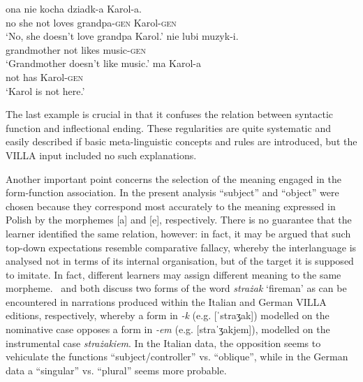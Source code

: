 \ea%
    \label{ex:08:6}
    \ea\label{ex:08:6a}
       {ona}   {nie}   {kocha}   {dziadk-a}   {Karol-a.} \\
            no  she  not  loves  grandpa-\textsc{gen}  Karol-\textsc{gen} \\
    \glt    ‘No, she doesn't love grandpa Karol.’
    \ex\label{ex:08:6b}
       {nie}   {lubi}   {muzyk-i.}\\
            grandmother  not  likes  music-\textsc{gen}\\
    \glt    ‘Grandmother doesn't like music.’
    \ex\label{ex:08:6c}
      {ma}  {Karol-a}\\
            not  has  Karol-\textsc{gen}\\
    \glt    ‘Karol is not here.’
    \z
\z

The last example is crucial in that it confuses the relation between syntactic function and inflectional ending. These regularities are quite systematic and easily described if basic meta-linguistic concepts and rules are introduced, but the VILLA input included no such explanations. 

Another important point concerns the selection of the meaning engaged in the form-function association. In the present analysis “subject” and “object” were chosen because they correspond most accurately to the meaning expressed in Polish by the morphemes [a] and [e], respectively. There is no guarantee that the learner identified the same relation, however: in fact, it may be argued that such top-down expectations resemble  comparative fallacy, whereby the interlanguage is analysed not in terms of its internal organisation, but of the target it is supposed to imitate. In fact, different learners may assign different meaning to the same morpheme. \citet{Bernini2018a}~and \citet[28-33]{Dimroth2018} both discuss two forms of the word \textit{strażak} ‘fireman’ as can be encountered in narrations produced within the Italian and German VILLA editions, respectively, whereby a form in \textit{{}-k} (e.g. [ˈstraʒak]) modelled on the nominative case opposes a form in \textit{{}-em} (e.g. [straˈʒakjem]), modelled on the instrumental case \textit{strażakiem}. In the Italian data, the opposition seems to vehiculate the functions “subject/controller” vs. “oblique”, while in the German data a “singular” vs. “plural” seems more probable. 


